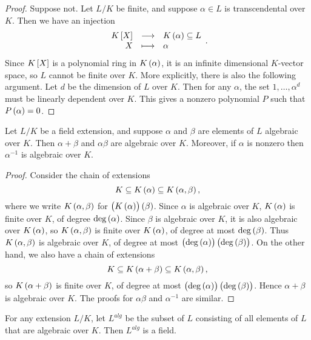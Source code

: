 \begin{proof}
Suppose not. Let $ L / K $ be finite, and suppose $ \alpha \in L $ is transcendental over $ K $. Then we have an injection
$$ \function{K\sbr{X}}{K\br{\alpha} \subseteq L}{X}{\alpha}. $$
Since $ K\sbr{X} $ is a polynomial ring in $ K\br{\alpha} $, it is an infinite dimensional $ K $-vector space, so $ L $ cannot be finite over $ K $. More explicitly, there is also the following argument. Let $ d $ be the dimension of $ L $ over $ K $. Then for any $ \alpha $, the set $ 1, \dots, \alpha^d $ must be linearly dependent over $ K $. This gives a nonzero polynomial $ P $ such that $ P\br{\alpha} = 0 $.
\end{proof}

\pagebreak

\begin{corollary}
Let $ L / K $ be a field extension, and suppose $ \alpha $ and $ \beta $ are elements of $ L $ algebraic over $ K $. Then $ \alpha + \beta $ and $ \alpha\beta $ are algebraic over $ K $. Moreover, if $ \alpha $ is nonzero then $ \alpha^{-1} $ is algebraic over $ K $.
\end{corollary}

\begin{proof}
Consider the chain of extensions
$$ K \subseteq K\br{\alpha} \subseteq K\br{\alpha, \beta}, $$
where we write $ K\br{\alpha, \beta} $ for $ \br{K\br{\alpha}}\br{\beta} $. Since $ \alpha $ is algebraic over $ K $, $ K\br{\alpha} $ is finite over $ K $, of degree $ \deg\br{\alpha} $. Since $ \beta $ is algebraic over $ K $, it is also algebraic over $ K\br{\alpha} $, so $ K\br{\alpha, \beta} $ is finite over $ K\br{\alpha} $, of degree at most $ \deg\br{\beta} $. Thus $ K\br{\alpha, \beta} $ is algebraic over $ K $, of degree at most $ \br{\deg\br{\alpha}}\br{\deg\br{\beta}} $. On the other hand, we also have a chain of extensions
$$ K \subseteq K\br{\alpha + \beta} \subseteq K\br{\alpha, \beta}, $$
so $ K\br{\alpha + \beta} $ is finite over $ K $, of degree at most $ \br{\deg\br{\alpha}}\br{\deg\br{\beta}} $. Hence $ \alpha + \beta $ is algebraic over $ K $. The proofs for $ \alpha\beta $ and $ \alpha^{-1} $ are similar.
\end{proof}

\begin{corollary}
For any extension $ L / K $, let $ L^{alg} $ be the subset of $ L $ consisting of all elements of $ L $ that are algebraic over $ K $. Then $ L^{alg} $ is a field.
\end{corollary}

